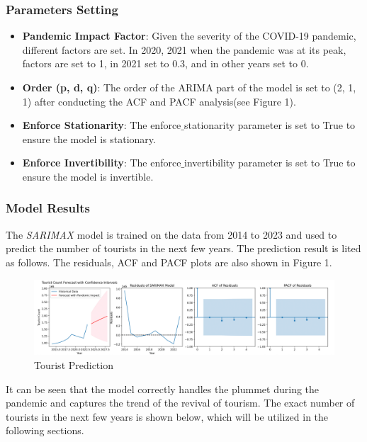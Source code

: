 \subsubsection{Parameters Setting}

\begin{itemize}
    \item \textbf{Pandemic Impact Factor}: Given the severity of the COVID-19 pandemic, different factors are set.
    In 2020, 2021 when the pandemic was at its peak, factors are set to 1, in 2021 set to 0.3, and in other years set to 0.
    \item \textbf{Order (p, d, q)}: The order of the ARIMA part of the model is set to (2, 1, 1) after conducting the ACF and PACF analysis(see Figure 1).
    \item \textbf{Enforce Stationarity}: The enforce$\_$stationarity parameter is set to True to ensure the model is stationary.
    \item \textbf{Enforce Invertibility}: The enforce$\_$invertibility parameter is set to True to ensure the model is invertible.
\end{itemize}

\subsubsection{Model Results}

The \textit{SARIMAX} model is trained on the data from 2014 to 2023 
and used to predict the number of tourists in the next few years.
The prediction result is lited as follows. The residuals, ACF and PACF plots are 
also shown in Figure 1.

\begin{figure}[H]
    \centering
    \includegraphics[width=1\textwidth]{Fig_Tourists.jpg} %
    \vspace{-0.4cm}
    \caption{Tourist Prediction}
\end{figure}

It can be seen that the model correctly handles the plummet during the pandemic and
captures the trend of the revival of tourism. The exact number of 
tourists in the next few years is shown below, which will be utilized in the following sections.

